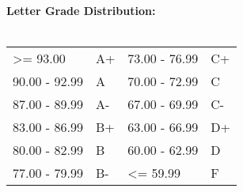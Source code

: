 \documentclass[11pt]{article}
\begin{document}
\textbf {Letter Grade Distribution:} \\\\
\hspace*{40mm}
\begin{tabular}{ l l | l l }
\textgreater= 93.00 & A+ & 73.00 - 76.99 & C+ \\
90.00 - 92.99 & A  & 70.00 - 72.99 & C \\
87.00 - 89.99 & A-  & 67.00 - 69.99 & C- \\
83.00 - 86.99 & B+  & 63.00 - 66.99 & D+ \\
80.00 - 82.99 & B  & 60.00 - 62.99 & D \\
77.00 - 79.99 & B-  & \textless= 59.99 & F \\
\end{tabular} \\
\end{document}
